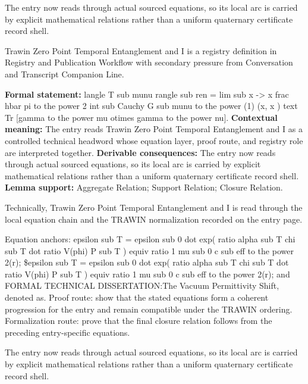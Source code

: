 The entry now reads through actual sourced equations, so its local arc is carried by explicit mathematical relations rather than a uniform quaternary certificate record shell.
\clearpage


\begingroup\small
{}
Trawin Zero Point Temporal Entanglement and I is a registry definition in Registry and Publication Workflow with secondary pressure from Conversation and Transcript Companion Line.

\begingroup\footnotesize\setlength{\emergencystretch}{3em}\sloppy
\textbf{Formal statement:} langle T sub munu rangle sub ren = lim sub x -> x frac hbar pi to the power 2 int sub Cauchy G sub munu to the power (1) (x, x ) text Tr [gamma to the power mu otimes gamma to the power nu]. \textbf{Contextual meaning:} The entry reads Trawin Zero Point Temporal Entanglement and I as a controlled technical headword whose equation layer, proof route, and registry role are interpreted together. \textbf{Derivable consequences:} The entry now reads through actual sourced equations, so its local arc is carried by explicit mathematical relations rather than a uniform quaternary certificate record shell. \textbf{Lemma support:} Aggregate Relation; Support Relation; Closure Relation.\par
\endgroup

Technically, Trawin Zero Point Temporal Entanglement and I is read through the local equation chain and the TRAWIN normalization recorded on the entry page.

Equation anchors: epsilon sub T = epsilon sub 0 dot exp( ratio alpha sub T chi sub T dot ratio V(phi) P sub T ) equiv ratio 1 mu sub 0 c sub eff to the power 2(r); \$epsilon sub T = epsilon sub 0 dot exp( ratio alpha sub T chi sub T dot ratio V(phi) P sub T ) equiv ratio 1 mu sub 0 c sub eff to the power 2(r); and FORMAL TECHNICAL DISSERTATION:The Vacuum Permittivity Shift, denoted as. Proof route: show that the stated equations form a coherent progression for the entry and remain compatible under the TRAWIN ordering. Formalization route: prove that the final closure relation follows from the preceding entry-specific equations.

The entry now reads through actual sourced equations, so its local arc is carried by explicit mathematical relations rather than a uniform quaternary certificate record shell.
\endgroup

